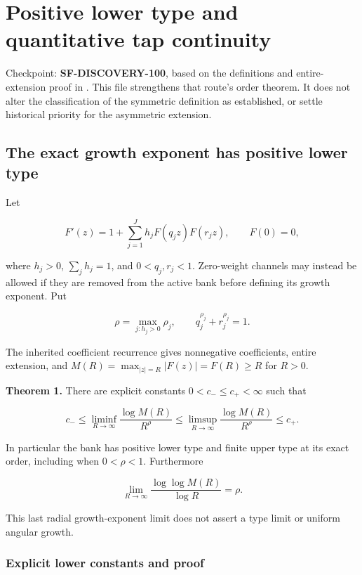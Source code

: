 \hypertarget{positive-lower-type-and-quantitative-tap-continuity}{%
\section{Positive lower type and quantitative tap
continuity}\label{positive-lower-type-and-quantitative-tap-continuity}}

Checkpoint: \textbf{SF-DISCOVERY-100}, based on the definitions and
entire-extension proof in . This
file strengthens that route's order theorem. It does not alter the
classification of the symmetric definition as established, or settle
historical priority for the asymmetric extension.

\hypertarget{the-exact-growth-exponent-has-positive-lower-type}{%
\subsection{The exact growth exponent has positive lower
type}\label{the-exact-growth-exponent-has-positive-lower-type}}

Let

\[
F'(z)=1+\sum_{j=1}^{J}h_jF(q_jz)F(r_jz),\qquad F(0)=0,
\]

where \(h_j>0\), \(\sum_jh_j=1\), and \(0<q_j,r_j<1\). Zero-weight
channels may instead be allowed if they are removed from the active bank
before defining its growth exponent. Put

\[
\rho=\max_{j:h_j>0}\rho_j,\qquad q_j^{\rho_j}+r_j^{\rho_j}=1.
\]

The inherited coefficient recurrence gives nonnegative coefficients,
entire extension, and \(M(R)=\max_{|z|=R}|F(z)|=F(R)\ge R\) for \(R>0\).

\textbf{Theorem 1.} There are explicit constants \(0<c_-\le c_+<\infty\)
such that

\[
c_-\le\liminf_{R\to\infty}\frac{\log M(R)}{R^\rho}
\le\limsup_{R\to\infty}\frac{\log M(R)}{R^\rho}\le c_+.
\]

In particular the bank has positive lower type and finite upper type at
its exact order, including when \(0<\rho<1\). Furthermore

\[
\lim_{R\to\infty}\frac{\log\log M(R)}{\log R}=\rho.
\]

This last radial growth-exponent limit does not assert a type limit or
uniform angular growth.

\hypertarget{explicit-lower-constants-and-proof}{%
\subsubsection{Explicit lower constants and
proof}\label{explicit-lower-constants-and-proof}}

